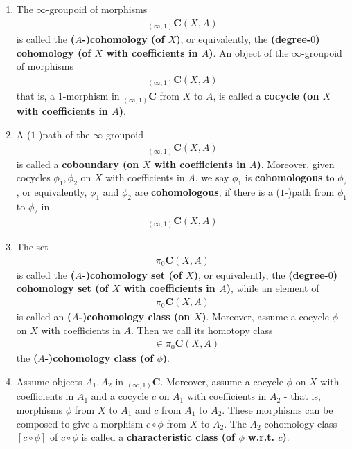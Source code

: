 \begin{enumerate}
\item[$\bullet$]
The $\infty$-groupoid of morphisms
\begin{align*}
  {}_{(\infty,1)}\mathbf{C}
  \left(
    X,
    A
  \right)
\end{align*}
is called the \textbf{($A$-)cohomology (of $X$)}, or equivalently, the \textbf{(degree-$0$) cohomology (of $X$ with coefficients in $A$)}.
An object of the $\infty$-groupoid of morphisms
\begin{align*}
  {}_{(\infty,1)}\mathbf{C}
  \left(
    X,
    A
  \right)
\end{align*}
that is, a $1$-morphism in ${}_{(\infty,1)}\mathbf{C}$ from $X$ to $A$, is called a \textbf{cocycle (on $X$ with coefficients in $A$)}.
\item[$\bullet$]
A ($1$-)path of the $\infty$-groupoid
\begin{align*}
  {}_{(\infty,1)}\mathbf{C}
  \left(
    X,
    A
  \right)
\end{align*}
is called a \textbf{coboundary (on $X$ with coefficients in $A$)}.
Moreover, given cocycles $\phi_{1}, \phi_{2}$ on $X$ with coefficients in $A$, we say $\phi_{1}$ is \textbf{cohomologous} to $\phi_{2}$, or equivalently, $\phi_{1}$ and $\phi_{2}$ are \textbf{cohomologous}, if there is a ($1$-)path from $\phi_{1}$ to $\phi_{2}$ in
\begin{align*}
  {}_{(\infty,1)}\mathbf{C}
  \left(
    X,
    A
  \right)
\end{align*}
\item[$\bullet$]
The set
\begin{align*}
  \pi_{0}
  \mathbf{C}
  \left(
    X,
    A
  \right)
\end{align*}
is called the \textbf{($A$-)cohomology set (of $X$)}, or equivalently, the \textbf{(degree-$0$) cohomology set (of $X$ with coefficients in $A$)}, while an element of
\begin{align*}
  \pi_{0}
  \mathbf{C}
  \left(
    X,
    A
  \right)
\end{align*}
is called an \textbf{($A$-)cohomology class (on $X$)}.
Moreover, assume a cocycle $\phi$ on $X$ with coefficients in $A$.
Then we call its homotopy class
\begin{align*}
  [\phi]
  &\in
  \pi_{0}
  \mathbf{C}
  \left(
    X,
    A
  \right)
\end{align*}
the \textbf{($A$-)cohomology class (of $\phi$)}.
\item[$\bullet$]
Assume objects $A_{1}, A_{2}$ in ${}_{(\infty,1)}\mathbf{C}$.
Moreover, assume a cocycle $\phi$ on $X$ with coefficients in $A_{1}$ and a cocycle $c$ on $A_{1}$ with coefficients in $A_{2}$ - that is, morphisms $\phi$ from $X$ to $A_{1}$ and $c$ from $A_{1}$ to $A_{2}$.
These morphisms can be composed to give a morphism $c \circ \phi$ from $X$ to $A_{2}$.
The $A_{2}$-cohomology class $[c \circ \phi]$ of $c \circ \phi$ is called a \textbf{characteristic class (of $\phi$ w.r.t. $c$)}.
\end{enumerate}
